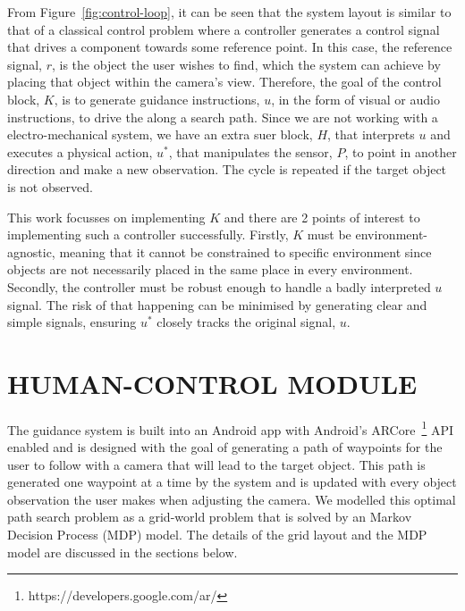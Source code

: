 \documentclass[a4paper, twoside]{article}
\begin{document}
From Figure~\ref{fig:control-loop}, it can be seen that the system layout is similar to that of a classical control problem where a controller generates a control signal that drives a component towards some reference point. In this case, the reference signal, $r$, is the object the user wishes to find, which the system can achieve by placing that object within the camera's view. Therefore, the goal of the control block, $K$, is to generate guidance instructions, $u$, in the form of visual or audio instructions, to drive the along a search path. Since we are not working with a electro-mechanical system, we have an extra suer block, $H$, that interprets $u$ and executes a physical action, $u^*$, that manipulates the sensor, $P$, to point in another direction and make a new observation. The cycle is repeated if the target object is not observed.  

This work focusses on implementing $K$ and there are 2 points of interest to implementing such a controller successfully. Firstly, $K$ must be environment-agnostic, meaning that it cannot be constrained to specific environment since objects are not necessarily placed in the same place in every environment. Secondly, the controller must be robust enough to handle a badly interpreted $u$ signal. The risk of that happening can be minimised by generating clear and simple signals, ensuring $u^*$ closely tracks the original signal, $u$. 

\section{\uppercase{Human-control Module}}\label{sec:controller-design}

\noindent The guidance system is built into an Android app with Android's ARCore~\footnote{https://developers.google.com/ar/} API enabled and is designed with the goal of generating a path of waypoints for the user to follow with a camera that will lead to the target object. This path is generated one waypoint at a time by the system and is updated with every object observation the user makes when adjusting the camera. We modelled this optimal path search problem as a grid-world problem that is solved by an Markov Decision Process (MDP) model. The details of the grid layout and the MDP model are discussed in the sections below. %
\end{document}
